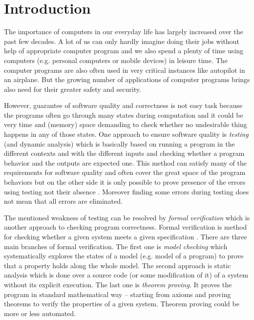 \chapter{Introduction}
The importance of computers in our everyday life has largely increased over the past few decades.
A lot of us can only hardly imagine doing their jobs without help of appropriate computer program
and we also spend a plenty of time using computers (e.g. personal computers or mobile devices) in leisure time.
The computer programs are also often used in very critical instances like autopilot in an airplane.
But the growing number of applications of computer programs brings also need for their greater safety and security.

However, guarantee of software quality and correctness is not easy task
because the programs often go through many states during computation
and it could be very time and (memory) space demanding to check whether no undesirable thing
happens in any of those states.
One approach to ensure software quality is \emph{testing} (and dynamic analysis) which is basically based
on running a program in the different contexts and with the different inputs
and checking whether a program behavior and the outputs are expected one.
This method can satisfy many of the requirements for software quality and often cover the great space of the program behaviors
but on the other side it is only possible to prove presence of the errors using testing not their absence \cite{dijkstra}.
Moreover finding some errors during testing does not mean that all errors are eliminated.

The mentioned weakness of testing can be resolved by \emph{formal verification}
which is another approach to checking program correctness.
Formal verification is method for checking whether a given system meets a given specification \cite{fav:lecture}.
There are three main branches of formal verification.
The first one is \emph{model checking} which systematically explores the states of a model (e.g. model of a program) to
prove that a property holds along the whole model.
The second approach is static analysis which is done over a source code (or some modification of it) of a system
without its explicit execution.
The last one is \emph{theorem proving}.
It proves the program in standard mathematical way -- starting from axioms and proving theorems to
verify the properties of a given system.
Theorem proving could be more or less automated.

